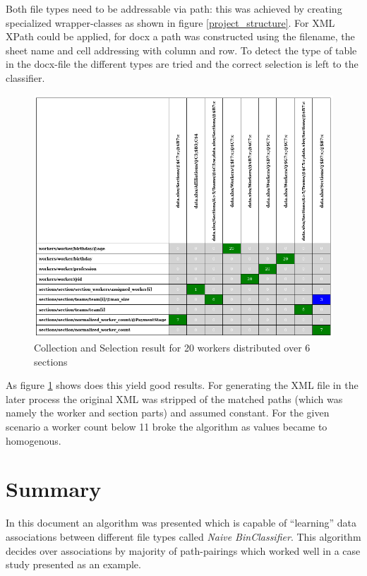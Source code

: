 \documentclass[conference]{IEEEtran}
\begin{document}
Both file types need to be addressable via path: this was achieved by creating specialized
wrapper-classes as shown in figure \ref{project_structure}. For XML XPath could be applied, for
docx a path was constructed using the filename, the sheet name and cell addressing with column and
row. To detect the type of table in the docx-file the different types are tried and the correct
selection is left to the classifier.
\begin{figure}[ht]
 \centering
 \includegraphics[scale=0.39]{img/example_table}
 \caption{Collection and Selection result for 20 workers distributed over 6 sections}
 \label{example_table}
\end{figure}
As figure \ref{example_table} shows does this yield good results. For generating the XML file in
the later process the original XML was stripped of the matched paths (which was namely the worker
and section parts) and assumed constant. For the given scenario a worker count below 11 broke the
algorithm as values became to homogenous.

\section{Summary}
In this document an algorithm was presented which is capable of ``learning'' data associations
between different file types called \textit{Naive BinClassifier}. This algorithm decides over
associations by majority of path-pairings which worked well in a case study presented as an
example.

\printbibliography
\end{document}
